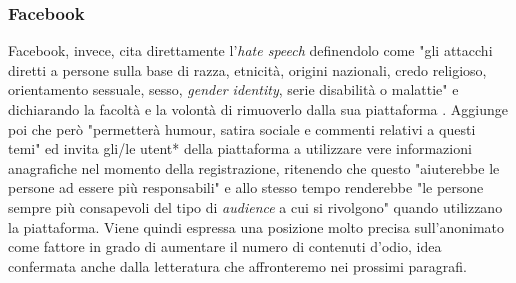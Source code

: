 \subsubsection{Facebook}
Facebook, invece, cita direttamente l'\textit{hate speech} definendolo come "gli attacchi diretti a persone sulla base di razza, etnicità, origini nazionali, credo religioso, orientamento sessuale, sesso, \textit{gender identity}, serie disabilità o malattie" e dichiarando la facoltà e la volontà di rimuoverlo dalla sua piattaforma  \citep{facebook2019}. Aggiunge poi che però "permetterà humour, satira sociale e commenti relativi a questi temi" ed invita gli/le utent* della piattaforma a utilizzare vere informazioni anagrafiche nel momento della registrazione, ritenendo che questo "aiuterebbe le persone ad essere più responsabili" e allo stesso tempo renderebbe  "le persone  sempre più consapevoli del tipo di \textit{audience} a cui si rivolgono" quando utilizzano la piattaforma. Viene quindi espressa una posizione molto precisa sull'anonimato come fattore in grado di aumentare il numero di contenuti d'odio, idea confermata anche dalla letteratura che affronteremo nei prossimi paragrafi.

